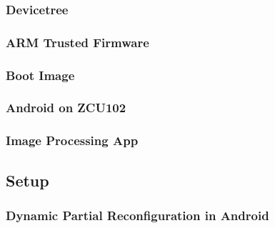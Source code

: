 \subsubsection{Devicetree}\label{sssec:devicetree}

%
\subsubsection{ARM Trusted Firmware}\label{sssec:atf}

%
\subsubsection{Boot Image}\label{sssec:bootimage}

%
\subsubsection{Android on ZCU102}\label{sssec:androidonzcu102}

%
\subsubsection{Image Processing App}\label{sssec:imageprocessingapp}



\subsection{Setup}\label{ssec:setup}

%
\subsubsection{Dynamic Partial Reconfiguration in Android}\label{sssec:dynamicpartialreconfiguration}
